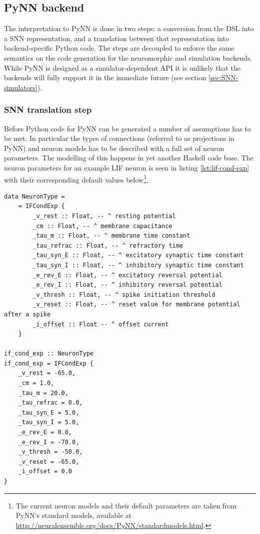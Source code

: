 \subsection{PyNN backend}
The interpretation to PyNN is done in two steps: a
conversion from the \gls{DSL} into a \gls{SNN} representation,
and a translation between that representation into backend-specific
Python code.
The steps are decoupled to enforce the same semantics on the code
generation for the neuromorphic and simulation backends.
While PyNN is designed as a simulator-dependent \gls{API} 
it is unlikely that the backends will fully support it in the
immediate future (see section \ref{sec:SNN-simulators}).

\subsubsection{\gls{SNN} translation step}
Before Python code for PyNN can be generated a number of assumptions
has to be met. 
In particular the types of connections (referred to as projections in PyNN)
and neuron models has to be described with a full set of neuron parameters.
The modelling of this happens in yet another Haskell code base.
The neuron parameters for an example LIF neuron is seen in listing
\ref{lst:lif-cond-exp} with their corresponding default values
below\footnote{
The current neuron models and their default parameters are taken from PyNN's
standard models, available at
\url{http://neuralensemble.org/docs/PyNN/standardmodels.html}.
}.

\begin{lstlisting}
data NeuronType =
    = IFCondExp {
        _v_rest :: Float, -- ^ resting potential
        _cm :: Float, -- ^ membrane capacitance
        _tau_m :: Float, -- ^ membrane time constant
        _tau_refrac :: Float, -- ^ refractory time
        _tau_syn_E :: Float, -- ^ excitatory synaptic time constant
        _tau_syn_I :: Float, -- ^ inhibitory synaptic time constant
        _e_rev_E :: Float, -- ^ excitatory reversal potential
        _e_rev_I :: Float, -- ^ inhibitory reversal potential
        _v_thresh :: Float, -- ^ spike initiation threshold
        _v_reset :: Float, -- ^ reset value for membrane potential after a spike
        _i_offset :: Float -- ^ offset current
    }

if_cond_exp :: NeuronType
if_cond_exp = IFCondExp {
    _v_rest = -65.0,
    _cm = 1.0,
    _tau_m = 20.0,
    _tau_refrac = 0.0,
    _tau_syn_E = 5.0,
    _tau_syn_I = 5.0,
    _e_rev_E = 0.0,
    _e_rev_I = -70.0,
    _v_thresh = -50.0,
    _v_reset = -65.0,
    _i_offset = 0.0
}
\end{lstlisting}

